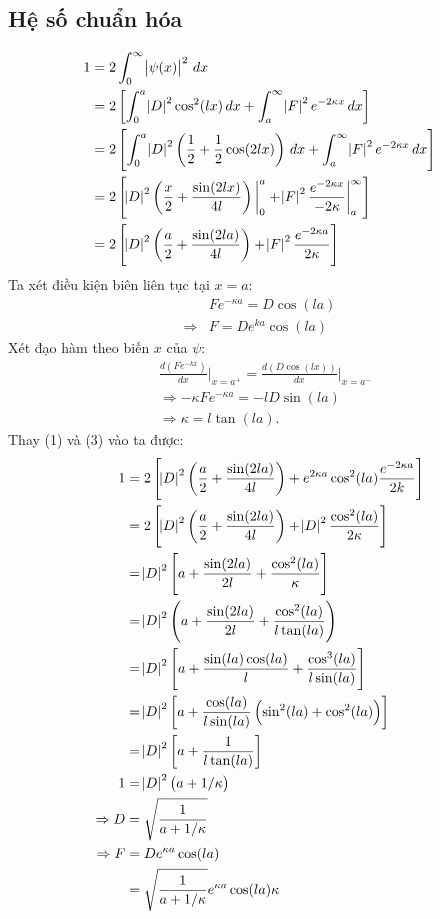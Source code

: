 \documentclass{article}
\newcommand{\at}[2]{\bigg\rvert_{#1}^{#2} }
\begin{document}
	\subsection{Hệ số chuẩn hóa}
	\begin{align*}
		1 &= 2 \int_{0}^{\infty} \abs{\psi(x)}^2 \, dx \\
		&= 2 \left[ \int_{0}^{a} \abs{D}^{2} \cos^{2}(lx) \, dx + \int_{a}^{\infty} \abs{F}^{2} e^{-2\kappa x} \, dx \right] \\
		&= 2 \left[ \int_{0}^{a} \abs{D}^{2} \left(\frac{1}{2} + \frac{1}{2} \cos(2lx)\right) \, dx + \int_{a}^{\infty} \abs{F}^{2} e^{-2\kappa x} \, dx \right]\\
		&= 2\left[\abs{D}^{2}\left(\frac{x}{2} + \frac{\sin(2lx)}{4l}\right)\at{0}{a} + \abs{F}^{2} \frac{e^{-2 \kappa x}}{-2\kappa} \at{a}{\infty} \right]\\
		&= 2 \left[ \abs{D}^2 \left(\frac{a}{2} + \frac{\sin(2la)}{4l}\right) + \abs{F}^2 \frac{e^{-2\kappa a}}{2\kappa}\right]
	\end{align*}
	Ta xét điều kiện biên liên tục tại $x = a$:
	\begin{align}
		&F e^{-\kappa a} = D \cos(la) \nonumber\\
		\Rightarrow &F = D e^{ka} \cos(la)
	\end{align}
	Xét đạo hàm theo biến $x$ của $\psi$:
	\begin{align}
		&\frac{d(F e^{-kx})}{dx} \at{x=a^+}{} = \frac{d(D \cos(lx))}{dx} \at{x=a^-}{} \nonumber \\
		&\Rightarrow -\kappa F e^{-\kappa a}  = - l D \sin(la) \nonumber\\
		&\Rightarrow \kappa = l \tan(la).
	\end{align}
	Thay (1) và (3) vào ta được:
	\begin{align*}
		1 &= 2 \left[ \abs{D}^2 \left(\dfrac{a}{2} + \dfrac{\sin(2la)}{4l}\right) + 	e^{2\kappa a} \cos^{2}(la) \frac{e^{-2\kappa a}}{2k}\right] \\
		&= 2 \left[ \abs{D}^2 \left(\dfrac{a}{2} + \dfrac{\sin(2la)}{4l}\right) + \abs{D}^2 	\dfrac{\cos^{2}(la)}{2\kappa}\right] \\
		&= \abs{D}^2 \left[a + \dfrac{\sin(2la)}{2l} + \dfrac{\cos^{2}(la)}{\kappa}\right] \\
		&= \abs{D}^2 \left(a + \dfrac{\sin(2la)}{2l} + \dfrac{\cos^{2}(la)}{l 	\tan(la)}\right) \\
		&= \abs{D}^2 \left[ a + \dfrac{\sin(la)\cos(la)}{l} + \frac{\cos^{3}(la)}{l 	\sin(la)}\right] \\
		&= \abs{D}^2 \left[a + \dfrac{\cos(la)}{l \sin(la)} \left(\sin^2(la) + 	\cos^2(la)\right)\right] \\
		&= \abs{D}^2 \left[a + \dfrac{1}{l \tan(la)}\right] \\
		1 &= \abs{D}^2 \left(a + 1/\kappa \right) \\
		\Rightarrow D &= \sqrt{\dfrac{1}{a + 1/\kappa }} \\
		\Rightarrow F &= D e^{\kappa a} \cos(la) \\
		&= \sqrt{\dfrac{1}{a + 1/\kappa }} e^{\kappa a} \cos(la)\kappa
	\end{align*}
	
	
	
\end{document}
